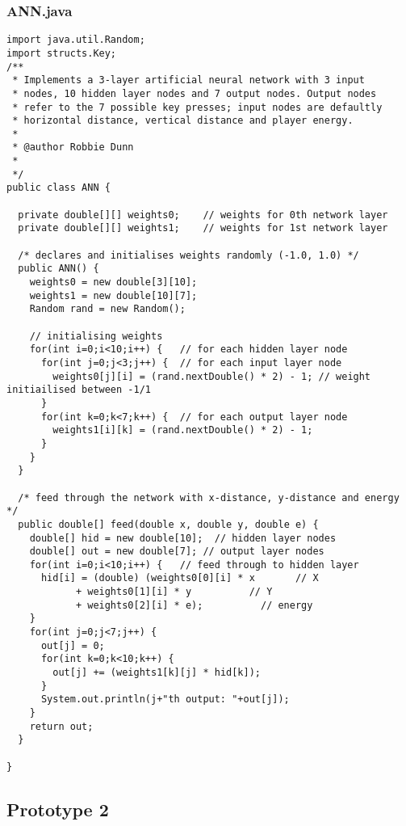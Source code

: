 \documentclass[12pt,a4paper]{article}
\begin{document}
\subsubsection{ANN.java}
\begin{lstlisting}
import java.util.Random;
import structs.Key;
/**
 * Implements a 3-layer artificial neural network with 3 input
 * nodes, 10 hidden layer nodes and 7 output nodes. Output nodes
 * refer to the 7 possible key presses; input nodes are defaultly
 * horizontal distance, vertical distance and player energy.
 * 
 * @author Robbie Dunn
 *
 */
public class ANN {
  
  private double[][] weights0;    // weights for 0th network layer
  private double[][] weights1;    // weights for 1st network layer

  /* declares and initialises weights randomly (-1.0, 1.0) */
  public ANN() {
    weights0 = new double[3][10];
    weights1 = new double[10][7];
    Random rand = new Random();
    
    // initialising weights
    for(int i=0;i<10;i++) {   // for each hidden layer node
      for(int j=0;j<3;j++) {  // for each input layer node
        weights0[j][i] = (rand.nextDouble() * 2) - 1; // weight initiailised between -1/1
      }
      for(int k=0;k<7;k++) {  // for each output layer node
        weights1[i][k] = (rand.nextDouble() * 2) - 1;
      }
    }
  }
  
  /* feed through the network with x-distance, y-distance and energy */
  public double[] feed(double x, double y, double e) {
    double[] hid = new double[10];  // hidden layer nodes
    double[] out = new double[7]; // output layer nodes
    for(int i=0;i<10;i++) {   // feed through to hidden layer
      hid[i] = (double) (weights0[0][i] * x       // X
            + weights0[1][i] * y          // Y
            + weights0[2][i] * e);          // energy
    }
    for(int j=0;j<7;j++) {
      out[j] = 0;
      for(int k=0;k<10;k++) {
        out[j] += (weights1[k][j] * hid[k]);
      }
      System.out.println(j+"th output: "+out[j]);
    }
    return out;
  }
  
}
\end{lstlisting}
\newpage
\subsection{Prototype 2}
\end{document}
